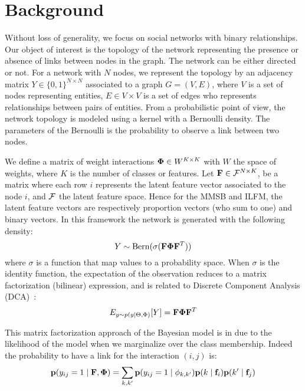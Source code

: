\section{Background}
\label{sec:background}
Without loss of generality, we focus on social networks with binary relationships. Our object of interest is the topology of the network representing the presence or absence of links between nodes in the graph. The network can be either directed or not. For a network with $N$ nodes, we represent the topology by an adjacency matrix $Y \in \{0,1\}^{N\times N}$ associated to a graph $G = (V,E)$, where $V$ is a set of nodes representing entities, $E \in V \times V$ is a set of edges who represents relationships between pairs of entities. From a probabilistic point of view, the network topology is modeled using a kernel with a Bernoulli density. The parameters of the Bernoulli is the probability to observe a link between two nodes.

We define a matrix of weight interactions $\mathbf{\Phi} \in W^{K\times K}$ with $W$ the space of weights, where $K$ is the number of classes or features. Let $\mathbf{F} \in \mathcal{F}^{N\times K}$, be a matrix where each row $i$ represents the latent feature vector associated to the node $i$,  and $\cal{F}$ the latent feature space. Hence for the MMSB and ILFM, the latent feature vectors are respectively proportion vectors (who sum to one) and binary vectors. In this framework the network is generated with the following density:
\begin{equation} \label{MFDCA}
    Y \sim \mathrm{Bern}(\sigma(\mat{F} \mat{\Phi}  \mat{F}^T))
\end{equation}
where $\sigma$ is a function that map values to a probability space. When $\sigma$ is the identity function, the expectation of the observation reduces to a matrix factorization (bilinear) expression, and is related to Discrete Component Analysis (DCA)~\cite{DCA}:
\begin{equation}
E_{y \sim p(y|\Theta, \Phi)}[Y] = \mathbf{F} \mathbf{\Phi}  \mathbf{F}^T
\end{equation}

This matrix factorization approach of the Bayesian model is in due to the likelihood of the model when we marginalize over the class membership. Indeed the probability to have a link for the interaction $(i,j)$ is:
\begin{equation} \label{eq:mf}
\pr(y_{ij}=1 \mid \mat{F}, \mat{\Phi } ) = \sum_{k, k'} \pr(y_{ij}=1\mid\phi_{k,k'}) \pr(k \mid \mat{f}_i) \pr(k' \mid \mat{f}_j)
\end{equation}


